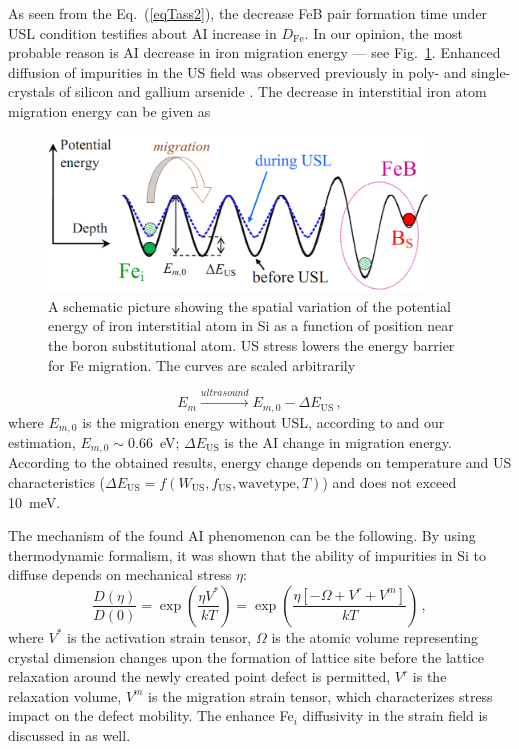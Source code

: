 \documentclass[sn-mathphys]{sn-jnl}%
\theoremstyle{thmstyleone}%
\theoremstyle{thmstyletwo}%
\theoremstyle{thmstylethree}%
\begin{document}
As seen from the Eq.~(\ref{eqTass2}), the decrease FeB pair formation time under USL condition testifies about
AI increase in $D_\mathrm{Fe}$.
In our opinion, the most probable reason is AI decrease in iron migration energy --- see Fig.~\ref{figUSChem}.
Enhanced diffusion of impurities in the US field was observed previously
in poly- and single-crystals of silicon and gallium arsenide \cite{Ostapenko1999,Zaveryukhin2002}.
The decrease in interstitial iron atom migration energy can be given as
\begin{figure}
\centering
 \includegraphics[width=0.9\textwidth]{Fig7}
\caption{
A schematic picture showing the spatial variation of the potential energy of
iron interstitial atom in Si as a function of position near the boron substitutional atom.
US stress lowers the energy barrier for Fe migration.
The curves are scaled arbitrarily
}
\label{figUSChem}       %
\end{figure}

\begin{equation}
\label{eqEmUs}
E_m \xrightarrow{ultrasound} E_{m,0}-\Delta E_\mathrm{US}\,,
\end{equation}
where $E_{m,0}$ is the migration energy without USL,
according to \cite{FeBAssJAP2014,FeBkinAPL2008} and our estimation, $E_{m,0}\sim0.66$~eV;
$\Delta E_\mathrm{US}$ is the AI change in migration energy.
According to the obtained results, energy change depends on temperature and US characteristics ($\Delta E_\mathrm{US}=f(W_\mathrm{US},f_\mathrm{US}, \mathrm{wave type}, T)$) and does not exceed 10~meV.

The mechanism of the found AI phenomenon can be the following.
By using thermodynamic formalism, it was shown \cite{AZIZ2001} that the ability of
impurities in Si to diffuse depends on mechanical stress $\eta$:
\begin{equation}
\label{eqTeor}
\frac{D(\eta)}{D(0)}=\exp\left(\frac{\eta V^*}{kT}\right)=
\exp\left(\frac{\eta [-\Omega+V^r+V^m]}{kT}\right)\,,
\end{equation}
where
$V^*$ is the activation strain tensor,
$\Omega$ is the atomic volume representing  crystal dimension changes
upon the formation of lattice site before the lattice relaxation
around the newly created point defect is permitted,
$V^r$ is the relaxation volume,
$V^m$ is the migration strain tensor, which characterizes stress impact on the defect mobility.
The enhance Fe$_i$ diffusivity in the strain field is discussed in \cite{FeStrain} as well.
\end{document}
